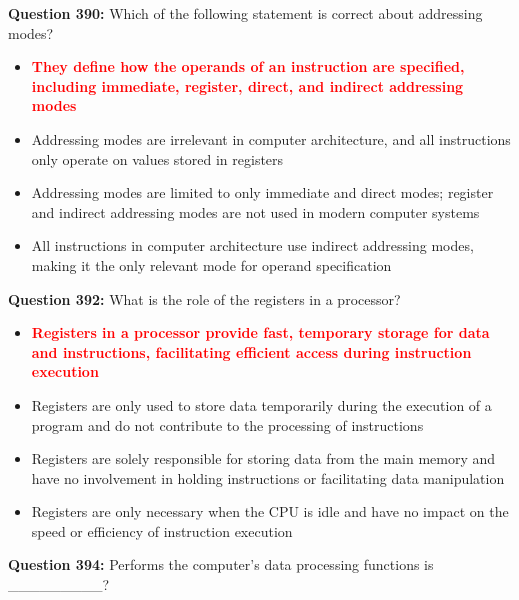 \documentclass[12pt,a4paper]{article}
\begin{document}
\vspace{0.5cm}

\textbf{Question 390:} Which of the following statement is correct about addressing modes?

\begin{itemize}
    \item[\textbf{A.}] \textcolor{red}{\textbf{They define how the operands of an instruction are specified, including immediate, register, direct, and indirect addressing modes}}
    \item[\textbf{B.}] Addressing modes are irrelevant in computer architecture, and all instructions only operate on values stored in registers
    \item[\textbf{C.}] Addressing modes are limited to only immediate and direct modes; register and indirect addressing modes are not used in modern computer systems
    \item[\textbf{D.}] All instructions in computer architecture use indirect addressing modes, making it the only relevant mode for operand specification
\end{itemize}

\vspace{0.5cm}

\textbf{Question 392:} What is the role of the registers in a processor?

\begin{itemize}
    \item[\textbf{A.}] \textcolor{red}{\textbf{Registers in a processor provide fast, temporary storage for data and instructions, facilitating efficient access during instruction execution}}
    \item[\textbf{B.}] Registers are only used to store data temporarily during the execution of a program and do not contribute to the processing of instructions
    \item[\textbf{C.}] Registers are solely responsible for storing data from the main memory and have no involvement in holding instructions or facilitating data manipulation
    \item[\textbf{D.}] Registers are only necessary when the CPU is idle and have no impact on the speed or efficiency of instruction execution
\end{itemize}

\vspace{0.5cm}

\textbf{Question 394:} Performs the computer's data processing functions is _________?
\end{document}
